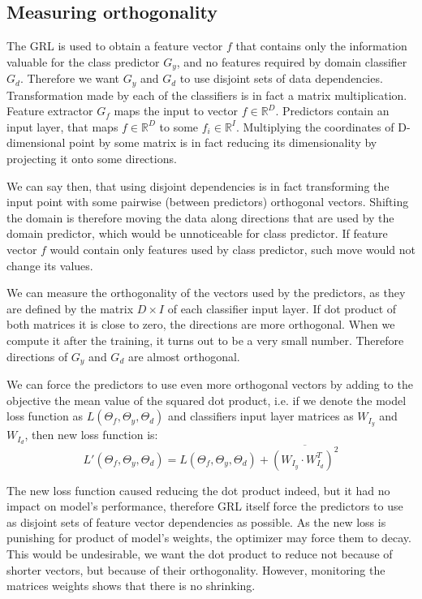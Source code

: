 \documentclass[shortabstract, inz, english]{iithesis}
\begin{document}
\subsection{Measuring orthogonality}
The GRL is used to obtain a feature vector $f$ that contains only the information valuable for the class predictor $G_{y}$, and no features required by domain classifier $G_{d}$. Therefore we want $G_{y}$ and $G_{d}$ to use disjoint sets of data dependencies. Transformation made by each of the classifiers is in fact a matrix multiplication. Feature extractor $G_{f}$ maps the input to vector $f \in \mathbb{R}^{D}$. Predictors contain an input layer, that maps $f \in \mathbb{R}^{D}$ to some $f_{i} \in \mathbb{R}^{I}$. Multiplying the coordinates of D-dimensional point by some matrix is in fact reducing its dimensionality by projecting it onto some directions. 
\par
We can say then, that using disjoint dependencies is in fact transforming the input point with some pairwise (between predictors) orthogonal vectors. Shifting the domain is therefore moving the data along directions that are used by the domain predictor, which would be unnoticeable for class predictor. If feature vector $f$ would contain only features used by class predictor, such move would not change its values. 
\par
We can measure the orthogonality of the vectors used by the predictors, as they are defined by the matrix $D \times I$ of each classifier input layer. If dot product of both matrices it is close to zero, the directions are more orthogonal. When we compute it after the training, it turns out to be a very small number. Therefore directions of $G_{y}$ and $G_{d}$ are almost orthogonal.
\par
We can force the predictors to use even more orthogonal vectors by adding to the objective the mean value of the squared dot product, i.e. if we denote the model loss function as $L(\Theta_{f}, \Theta_{y}, \Theta_{d})$ and classifiers input layer matrices as $W_{I_{y}}$ and $W_{I_{d}}$, then new loss function is:
\begin{equation*}
L'(\Theta_{f}, \Theta_{y}, \Theta_{d}) = L(\Theta_{f}, \Theta_{y}, \Theta_{d}) + \overline{(W_{I_{y}} \cdot W_{I_{d}}^{T})^{2}}
\end{equation*}
\par
The new loss function caused reducing the dot product indeed, but it had no impact on model's performance, therefore GRL itself force the predictors to use as disjoint sets of feature vector dependencies as possible. As the new loss is punishing for product of model's weights, the optimizer may force them to decay. This would be undesirable, we want the dot product to reduce not because of shorter vectors, but because of their orthogonality. However, monitoring the matrices weights shows that there is no shrinking. 
\end{document}
